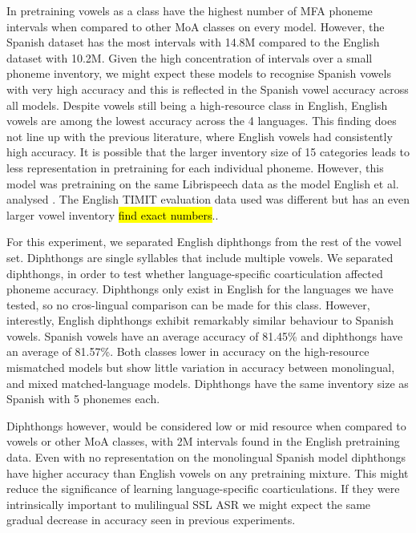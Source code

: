 In pretraining vowels as a class have the highest number of MFA phoneme intervals when compared to other MoA classes on every model. However, the Spanish dataset has the most intervals with 14.8M compared to the English dataset with 10.2M. Given the high concentration of intervals over a small phoneme inventory, we might expect these models to recognise Spanish vowels with very high accuracy and this is reflected in the Spanish vowel accuracy across all models. Despite vowels still being a high-resource class in English, English vowels are among the lowest accuracy across the 4 languages. This finding does not line up with the previous literature, where English vowels had consistently high accuracy. It is possible that the larger inventory size of 15 categories leads to less representation in pretraining for each individual phoneme. However, this model was pretraining on the same Librispeech \cite{librispeech} data as the model English et al. analysed \cite{english2022domain}. The English TIMIT evaluation data used was different but has an even larger vowel inventory \hl{find exact numbers}.. 

For this experiment, we separated English diphthongs from the rest of the vowel set. Diphthongs are single syllables that include multiple vowels. We separated diphthongs, in order to test whether language-specific coarticulation affected phoneme accuracy. Diphthongs only exist in English for the languages we have tested, so no cros-lingual comparison can be made for this class. However, interestly, English diphthongs exhibit remarkably similar behaviour to Spanish vowels. Spanish vowels have an average accuracy of 81.45\% and diphthongs have an average of 81.57\%. Both classes lower in accuracy on the high-resource mismatched models but show little variation in accuracy between monolingual, and mixed matched-language models. Diphthongs have the same inventory size as Spanish with 5 phonemes each. 

Diphthongs however, would be considered low or mid resource when compared to vowels or other MoA classes, with 2M intervals found in the English pretraining data. Even with no representation on the monolingual Spanish model diphthongs have higher accuracy than English vowels on any pretraining mixture. This might reduce the significance of learning language-specific coarticulations. If they were intrinsically important to mulilingual SSL ASR we might expect the same gradual decrease in accuracy seen in previous experiments. 

